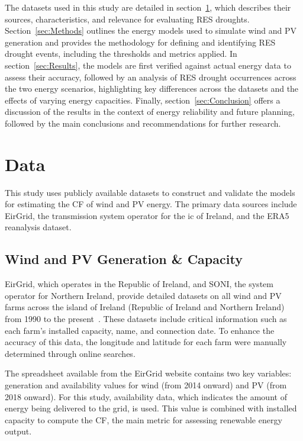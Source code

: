 \documentclass[a4paper, 11pt]{article}
\begin{document}
The datasets used in this study are detailed in section~\ref{sec:Data}, which describes their sources, characteristics, and relevance for evaluating RES droughts. Section~\ref{sec:Methods} outlines the energy models used to simulate wind and PV generation and provides the methodology for defining and identifying RES drought events, including the thresholds and metrics applied. In section~\ref{sec:Results}, the models are first verified against actual energy data to assess their accuracy, followed by an analysis of RES drought occurrences across the two energy scenarios, highlighting key differences across the datasets and the effects of varying energy capacities. Finally, section~\ref{sec:Conclusion} offers a discussion of the results in the context of energy reliability and future planning, followed by the main conclusions and recommendations for further research.

\section{Data}
\label{sec:Data}

This study uses publicly available datasets to construct and validate the models for estimating the CF of wind and PV energy. The primary data sources include EirGrid, the transmission system operator for the ic of Ireland, and the ERA5 reanalysis dataset.

\subsection{Wind and PV Generation \& Capacity}
\label{sec:eirgrid}

EirGrid, which operates in the Republic of Ireland, and SONI, the system operator for Northern Ireland, provide detailed datasets on all wind and PV farms across the island of Ireland (Republic of Ireland and Northern Ireland) from 1990 to the present~\cite{eirgrid}. These datasets include critical information such as each farm’s installed capacity, name, and connection date. To enhance the accuracy of this data, the longitude and latitude for each farm were manually determined through online searches.

The spreadsheet available from the EirGrid website contains two key variables: generation and availability values for wind (from 2014 onward) and PV (from 2018 onward). For this study, availability data, which indicates the amount of energy being delivered to the grid, is used. This value is combined with installed capacity to compute the CF, the main metric for assessing renewable energy output.
\end{document}
